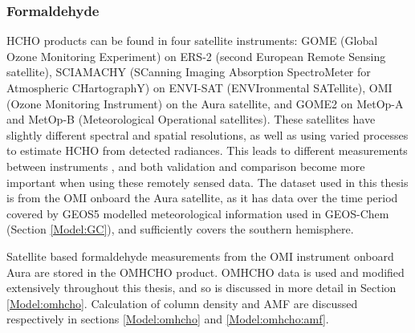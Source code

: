     
    
    
    
    \subsubsection{Formaldehyde}
      
      HCHO products can be found in four satellite instruments: GOME (Global Ozone Monitoring Experiment) on ERS-2 (second European Remote Sensing satellite), SCIAMACHY (SCanning Imaging Absorption SpectroMeter for Atmospheric CHartographY) on ENVI-SAT (ENVIronmental SATellite), OMI (Ozone Monitoring Instrument) on the Aura satellite, and GOME2 on MetOp-A and MetOp-B (Meteorological Operational satellites).
      These satellites have slightly different spectral and spatial resolutions, as well as using varied processes to estimate HCHO from detected radiances.
      This leads to different measurements between instruments \parencite{Lorente2017}, and both validation and comparison become more important when using these remotely sensed data.
      The dataset used in this thesis is from the OMI onboard the Aura satellite, as it has data over the time period covered by GEOS5 modelled meteorological information used in GEOS-Chem (Section \ref{Model:GC}), and sufficiently covers the southern hemisphere.
      
      Satellite based formaldehyde measurements from the OMI instrument onboard Aura are stored in the OMHCHO product.
      OMHCHO data is used and modified extensively throughout this thesis, and so is discussed in more detail in Section \ref{Model:omhcho}.
      Calculation of column density and AMF are discussed respectively in sections \ref{Model:omhcho} and \ref{Model:omhcho:amf}.
      
      
